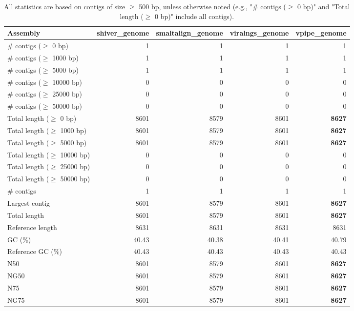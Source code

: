 \documentclass[12pt,a4paper]{article}
\begin{document}
\begin{table}[ht]
\begin{center}
\caption{All statistics are based on contigs of size $\geq$ 500 bp, unless otherwise noted (e.g., "\# contigs ($\geq$ 0 bp)" and "Total length ($\geq$ 0 bp)" include all contigs).}
\begin{tabular}{|l*{4}{|r}|}
\hline
Assembly & shiver\_genome & smaltalign\_genome & viralngs\_genome & vpipe\_genome \\ \hline
\# contigs ($\geq$ 0 bp) & 1 & 1 & 1 & 1 \\ \hline
\# contigs ($\geq$ 1000 bp) & 1 & 1 & 1 & 1 \\ \hline
\# contigs ($\geq$ 5000 bp) & 1 & 1 & 1 & 1 \\ \hline
\# contigs ($\geq$ 10000 bp) & 0 & 0 & 0 & 0 \\ \hline
\# contigs ($\geq$ 25000 bp) & 0 & 0 & 0 & 0 \\ \hline
\# contigs ($\geq$ 50000 bp) & 0 & 0 & 0 & 0 \\ \hline
Total length ($\geq$ 0 bp) & 8601 & 8579 & 8601 & {\bf 8627} \\ \hline
Total length ($\geq$ 1000 bp) & 8601 & 8579 & 8601 & {\bf 8627} \\ \hline
Total length ($\geq$ 5000 bp) & 8601 & 8579 & 8601 & {\bf 8627} \\ \hline
Total length ($\geq$ 10000 bp) & 0 & 0 & 0 & 0 \\ \hline
Total length ($\geq$ 25000 bp) & 0 & 0 & 0 & 0 \\ \hline
Total length ($\geq$ 50000 bp) & 0 & 0 & 0 & 0 \\ \hline
\# contigs & 1 & 1 & 1 & 1 \\ \hline
Largest contig & 8601 & 8579 & 8601 & {\bf 8627} \\ \hline
Total length & 8601 & 8579 & 8601 & {\bf 8627} \\ \hline
Reference length & 8631 & 8631 & 8631 & 8631 \\ \hline
GC (\%) & 40.43 & 40.38 & 40.41 & 40.79 \\ \hline
Reference GC (\%) & 40.43 & 40.43 & 40.43 & 40.43 \\ \hline
N50 & 8601 & 8579 & 8601 & {\bf 8627} \\ \hline
NG50 & 8601 & 8579 & 8601 & {\bf 8627} \\ \hline
N75 & 8601 & 8579 & 8601 & {\bf 8627} \\ \hline
NG75 & 8601 & 8579 & 8601 & {\bf 8627} \\ \hline

\end{tabular}
\end{center}
\end{table}
\end{document}
